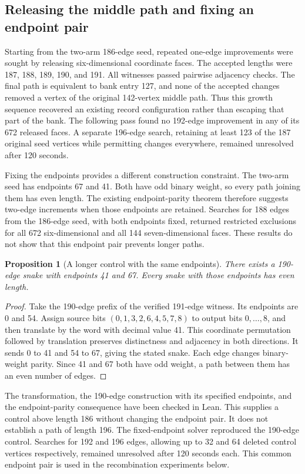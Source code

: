 \documentclass[11pt,a4paper]{article}
\newtheorem{proposition}[theorem]{Proposition}
\theoremstyle{definition}
\theoremstyle{remark}
\begin{document}
\subsection{Releasing the middle path and fixing an endpoint pair}
Starting from the two-arm 186-edge seed, repeated one-edge improvements were sought by releasing six-dimensional coordinate faces. The accepted lengths were 187, 188, 189, 190, and 191. All witnesses passed pairwise adjacency checks. The final path is equivalent to bank entry 127, and none of the accepted changes removed a vertex of the original 142-vertex middle path. Thus this growth sequence recovered an existing record configuration rather than escaping that part of the bank. The following pass found no 192-edge improvement in any of its 672 released faces. A separate 196-edge search, retaining at least 123 of the 187 original seed vertices while permitting changes everywhere, remained unresolved after 120 seconds.

Fixing the endpoints provides a different construction constraint. The two-arm seed has endpoints 67 and 41. Both have odd binary weight, so every path joining them has even length. The existing endpoint-parity theorem therefore suggests two-edge increments when those endpoints are retained. Searches for 188 edges from the 186-edge seed, with both endpoints fixed, returned restricted exclusions for all 672 six-dimensional and all 144 seven-dimensional faces. These results do not show that this endpoint pair prevents longer paths.

\begin{proposition}[A longer control with the same endpoints]
There exists a 190-edge snake with endpoints 41 and 67. Every snake with those endpoints has even length.
\end{proposition}
\begin{proof}
Take the 190-edge prefix of the verified 191-edge witness. Its endpoints are 0 and 54. Assign source bits $(0,1,3,2,6,4,5,7,8)$ to output bits $0,\ldots,8$, and then translate by the word with decimal value 41. This coordinate permutation followed by translation preserves distinctness and adjacency in both directions. It sends 0 to 41 and 54 to 67, giving the stated snake. Each edge changes binary-weight parity. Since 41 and 67 both have odd weight, a path between them has an even number of edges.
\end{proof}
The transformation, the 190-edge construction with its specified endpoints, and the endpoint-parity consequence have been checked in Lean. This supplies a control above length 186 without changing the endpoint pair. It does not establish a path of length 196. The fixed-endpoint solver reproduced the 190-edge control. Searches for 192 and 196 edges, allowing up to 32 and 64 deleted control vertices respectively, remained unresolved after 120 seconds each. This common endpoint pair is used in the recombination experiments below.
\end{document}
